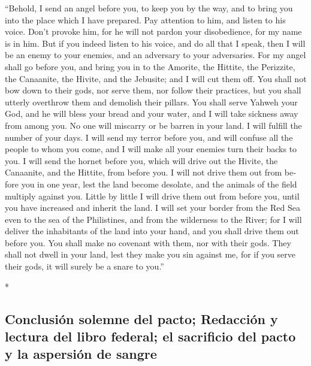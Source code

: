 \begin{paracol}{2}
\begin{otherlanguage}{english}
 ``Behold, I send an angel before you, to keep you by the
way, and to bring you into the place which I have prepared.
 Pay attention to him, and listen to his voice. Don't
provoke him, for he will not pardon your disobedience, for my name is in
him.  But if you indeed listen to his voice, and do all
that I speak, then I will be an enemy to your enemies, and an adversary
to your adversaries.  For my angel shall go before you,
and bring you in to the Amorite, the Hittite, the Perizzite, the
Canaanite, the Hivite, and the Jebusite; and I will cut them off.
 You shall not bow down to their gods, nor serve them,
nor follow their practices, but you shall utterly overthrow them and
demolish their pillars.  You shall serve Yahweh your God,
and he will bless your bread and your water, and I will take sickness
away from among you.  No one will miscarry or be barren
in your land. I will fulfill the number of your days.  I
will send my terror before you, and will confuse all the people to whom
you come, and I will make all your enemies turn their backs to you.
 I will send the hornet before you, which will drive out
the Hivite, the Canaanite, and the Hittite, from before you.
 I will not drive them out from before you in one year,
lest the land become desolate, and the animals of the field multiply
against you.  Little by little I will drive them out from
before you, until you have increased and inherit the land.
 I will set your border from the Red Sea even to the sea
of the Philistines, and from the wilderness to the River; for I will
deliver the inhabitants of the land into your hand, and you shall drive
them out before you.  You shall make no covenant with
them, nor with their gods.  They shall not dwell in your
land, lest they make you sin against me, for if you serve their gods, it
will surely be a snare to you.''

\end{otherlanguage}

\switchcolumn[0]*

\hypertarget{conclusiuxf3n-solemne-del-pacto-redacciuxf3n-y-lectura-del-libro-federal-el-sacrificio-del-pacto-y-la-aspersiuxf3n-de-sangre}{%
\subsection{Conclusión solemne del pacto; Redacción y lectura del libro
federal; el sacrificio del pacto y la aspersión de
sangre}\label{conclusiuxf3n-solemne-del-pacto-redacciuxf3n-y-lectura-del-libro-federal-el-sacrificio-del-pacto-y-la-aspersiuxf3n-de-sangre}}


\end{paracol}
